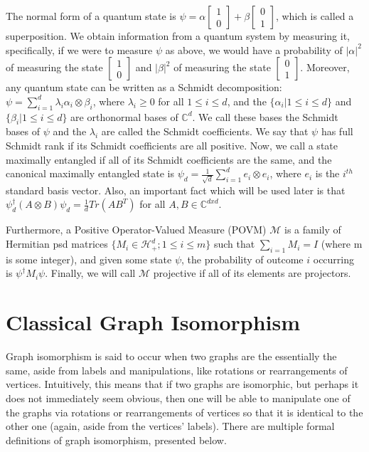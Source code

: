 \documentclass[12pt]{article}
\begin{document}
The normal form of a quantum state is $\psi = \alpha \begin{bmatrix}
1 \\
0 
\end{bmatrix}
+ \beta
\begin{bmatrix}
0 \\
1
\end{bmatrix}
$, which is called a superposition. We obtain information from a quantum system by measuring it, specifically, if we were to measure $\psi$ as above, we would have a probability of $|\alpha|^2$ of measuring the state $\begin{bmatrix}
1 \\
0 
\end{bmatrix}$ and $|\beta|^2$ of measuring the state $\begin{bmatrix}
0 \\
1 
\end{bmatrix}$. Moreover, any quantum state can be written as a Schmidt decomposition: $\psi = \sum_{i=1}^d \lambda_i \alpha_i \otimes \beta_i$, where $\lambda_i \geq 0$ for all $1 \leq i \leq d$, and the $\{\alpha_i| 1 \leq i \leq d\}$ and $\{\beta_i| 1 \leq i \leq d\}$ are orthonormal bases of $\mathbb{C}^d$. We call these bases the Schmidt bases of $\psi$ and the $\lambda_i$ are called the Schmidt coefficients. We say that $\psi$ has full Schmidt rank if its Schmidt coefficients are all positive. Now, we call a state maximally entangled if all of its Schmidt coefficients are the same, and the canonical maximally entangled state is $\psi_d = \frac{1}{\sqrt{d}} \sum_{i=1}^d e_i \otimes e_i$, where $e_i$ is the $i^{th}$ standard basis vector. Also, an important fact which will be used later is that $\psi^{\dag}_d (A \otimes B) \psi_d = \frac{1}{d} Tr(AB^T)$ for all $A, B \in \mathbb{C}^{dxd}$.

Furthermore, a Positive Operator-Valued Measure (POVM) $\mathcal{M}$ is a family of Hermitian psd matrices $\{ M_i \in \mathcal{H}^d_+; 1 \leq i \leq m \}$ such that $\sum_{i=1}M_i = I$ (where m is some integer), and given some state $\psi$, the probability of outcome $i$ occurring is $\psi^\dag M_i \psi$. Finally, we will call $\mathcal{M}$ projective if all of its elements are projectors.


\section{Classical Graph Isomorphism} \label{classical}
Graph isomorphism is said to occur when two graphs are the essentially the same, aside from labels and manipulations, like rotations or rearrangements of vertices. Intuitively, this means that if two graphs are isomorphic, but perhaps it does not immediately seem obvious, then one will be able to manipulate one of the graphs via rotations or rearrangements of vertices so that it is identical to the other one (again, aside from the vertices' labels). There are multiple formal definitions of graph isomorphism, presented below.
\end{document}
